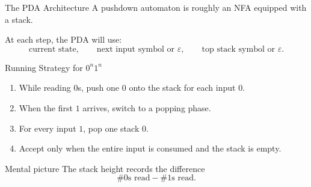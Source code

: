 \documentclass[aspectratio=169,10pt]{beamer}
\newcommand{\eps}{\varepsilon}
\begin{document}
\begin{frame}{The PDA Architecture}
A \alert{pushdown automaton} is roughly an NFA equipped with a stack.

\vspace{0.8em}
\centering
{}

\vspace{0.9em}
At each step, the PDA will use:
\[
\text{current state},\qquad
\text{next input symbol or }\eps,\qquad
\text{top stack symbol or }\eps.
\]
\end{frame}

\begin{frame}{Running Strategy for $0^n1^n$}
\begin{enumerate}
    \item While reading $0$s, push one $0$ onto the stack for each input $0$.
    \item When the first $1$ arrives, switch to a popping phase.
    \item For every input $1$, pop one stack $0$.
    \item Accept only when the entire input is consumed and the stack is empty.
\end{enumerate}

\vspace{0.8em}
\begin{exampleblock}{Mental picture}
The stack height records the difference
\[
\#0\text{s read}-\#1\text{s read}.
\]
\end{exampleblock}
\end{frame}
\end{document}
